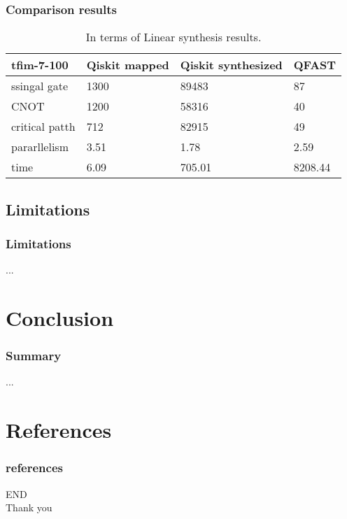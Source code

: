 \documentclass[aspectratio=1610]{beamer}
\begin{document}
\begin{frame}
  \frametitle{Comparison results}

  \begin{table}[]
    \begin{tabular}{l|lll}
    tfim-7-100  & Qiskit mapped & Qiskit synthesized & QFAST  \\\hline
    ssingal gate    & 1300          & 89483              & 87      \\
    CNOT           & 1200          & 58316              & 40      \\
    critical patth & 712           & 82915              & 49      \\
    pararllelism   & 3.51          & 1.78               & 2.59    \\
    time           & 6.09          & 705.01             & 8208.44
    \end{tabular}
    \caption{In terms of Linear synthesis results.}
    \end{table}
\end{frame}
\subsection{Limitations}
\begin{frame}
\frametitle{Limitations}
...
\end{frame}

\section{Conclusion}
\begin{frame}
\frametitle{Summary}
...
\end{frame}

\section{References}
\begin{frame}
	\frametitle{references}
	\printbibliography
\end{frame}
\begin{frame}
  \centering
  \Huge{END\\Thank you}
\end{frame}
\end{document}
